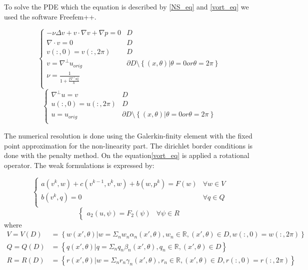To solve the PDE which the equation is described by \eqref{NS_eq} and \eqref{vort_eq} we used the software Freefem++.

\begin{equation}\label{NS_eq}
\begin{cases}
-\nu\Delta v + v\cdot\nabla v + \nabla p = 0 & D \\
\nabla\cdot v = 0   & D \\
v(:,0) = v(:,2\pi) & D \\
v= \nabla^\bot u_{orig} & \partial D\setminus\left\lbrace(x,\theta)|\theta = 0 or \theta = 2\pi\right\rbrace \\
\nu =\frac{1}{1+\frac{\Vert\nabla^\bot u\Vert}{k}} \\
\end{cases}
\end{equation}
\begin{equation}\label{vort_eq}
\begin{cases}
\nabla^\bot u = v & D \\
u(:,0) = u(:,2\pi) & D \\
u = u_{orig} & \partial D\setminus\left\lbrace(x,\theta)|\theta = 0 or \theta = 2\pi\right\rbrace \\
\end{cases}
\end{equation}


The numerical resolution is done using the Galerkin-finity element with the fixed point approximation for the non-linearity part. The dirichlet border conditions is done with the penalty method. On the equation\eqref{vort_eq} is applied a rotational operator. The weak formulations is expressed by:

\begin{equation}\label{NS_ef}
\begin{cases}
a(v^k,w)+c(v^{k-1},v^{k},w)+b(w,p^k)=F(w) & \forall w \in V \\
b(v^k,q)=0 & \forall q \in Q \\
\end{cases}
\end{equation}
\begin{equation}\label{vort_ef}
\begin{cases}
a_2(u,\psi) = F_2(\psi) & \forall \psi \in R
\end{cases}
\end{equation}
where
\begin{align*}
V = V(D) &= \left\lbrace{w(x',\theta)|w=\Sigma_n{w_n\alpha_n(x',\theta)},w_n \in \mathbb{R},(x',\theta) \in D, w(:,0)=w(:,2\pi)} \right\rbrace \\
Q = Q(D) &= \left\lbrace{q(x',\theta)|q=\Sigma_n{q_n\beta_n(x',\theta)},q_n \in \mathbb{R},(x',\theta) \in D} \right\rbrace \\
R = R(D) &= \left\lbrace{r(x',\theta)|w=\Sigma_n{r_n\gamma_n(x',\theta)},r_n \in \mathbb{R},(x',\theta) \in D, r(:,0)=r(:,2\pi)} \right\rbrace \\
\end{align*}

